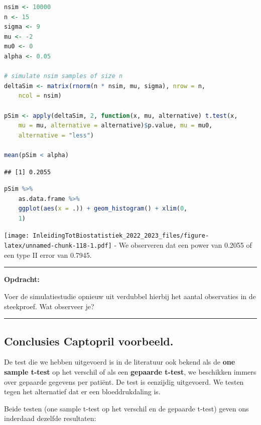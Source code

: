 \documentclass[
  12pt,dutch,coursenotes]{book}
\begin{document}
\begin{lstlisting}[language=R]
nsim <- 10000
n <- 15
sigma <- 9
mu <- -2
mu0 <- 0
alpha <- 0.05

# simulate nsim samples of size n
deltaSim <- matrix(rnorm(n * nsim, mu, sigma), nrow = n,
    ncol = nsim)

pSim <- apply(deltaSim, 2, function(x, mu, alternative) t.test(x,
    mu = mu, alternative = alternative)$p.value, mu = mu0,
    alternative = "less")

mean(pSim < alpha)
\end{lstlisting}

\begin{lstlisting}
## [1] 0.2055
\end{lstlisting}

\begin{lstlisting}[language=R]
pSim %>%
    as.data.frame %>%
    ggplot(aes(x = .)) + geom_histogram() + xlim(0,
    1)
\end{lstlisting}

\texttt{[image: InleidingTotBiostatistiek\_2022\_2023\_files/figure-latex/unnamed-chunk-118-1.pdf]}
- We observeren dat een power van 0.2055 of een type II error van 0.7945.

\begin{center}\rule{0.5\linewidth}{0.5pt}\end{center}

\textbf{Opdracht:}

Voer de simulatiestudie opnieuw uit verdubbel hierbij het aantal observaties in de steekproef. Wat observeer je?

\begin{center}\rule{0.5\linewidth}{0.5pt}\end{center}

\hypertarget{conclusies-captopril-voorbeeld.}{%
\subsection{Conclusies Captopril voorbeeld.}\label{conclusies-captopril-voorbeeld.}}

De test die we hebben uitgevoerd is in de literatuur ook bekend als de \textbf{one sample t-test} op het verschil of als een \textbf{gepaarde t-test}, we beschikken immers over gepaarde gegevens per patiënt.
De test is eenzijdig uitgevoerd. We testen tegen het alternatief dat er een bloeddrukdaling is.

Beide testen (one sample t-test op het verschil en de gepaarde t-test) geven ons inderdaad dezelfde resultaten:
\end{document}

